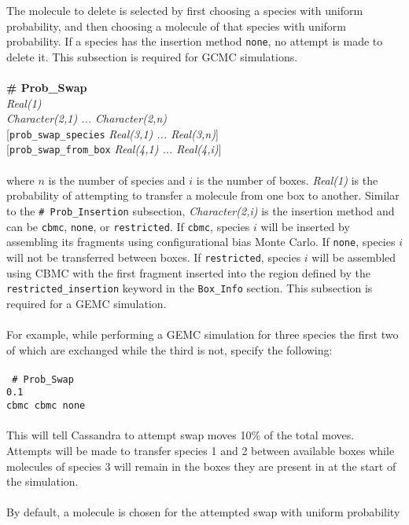 The molecule to delete is selected by first choosing a species with uniform probability, 
and then choosing a molecule of that species with uniform probability.
If a species has the insertion method \texttt{none}, no attempt is made to delete it. 
This subsection is required for GCMC simulations. \\ \\
%
%
%
{\bf \# Prob\_Swap}\\
{\it Real(1)} \\ 
{\it Character(2,1) ... Character(2,n)} \\
{[}{\tt prob\_swap\_species} {\it Real(3,1) ... Real(3,n)}] \\
{[}{\tt prob\_swap\_from\_box} {\it Real(4,1) ... Real(4,i)}] \\ \\
%
where $n$ is the number of species and $i$ is the number of boxes.
{\em Real(1)} is the probability of attempting to transfer a molecule from one box to another. 
Similar to the \texttt{\# Prob\_Insertion} subsection, 
{\em Character(2,i)} is the insertion method and can be 
\texttt{cbmc}, \texttt{none}, or \texttt{restricted}.
If \texttt{cbmc}, species $i$ will be inserted by assembling its 
fragments using configurational bias Monte Carlo.
If \texttt{none}, species $i$ will not be transferred between boxes.
If \texttt{restricted}, species $i$ will be assembled using CBMC
with the first fragment inserted into the region defined by 
the \texttt{restricted\_insertion} keyword in the \texttt{Box\_Info} section.
This subsection is required for a GEMC simulation. \\ \\
%
For example, while performing a GEMC simulation for three species the first two of which are exchanged
while the third is not, specify the following: \\ \\
%
\texttt{ \# Prob\_Swap\\
0.1 \\ 
cbmc cbmc none \\ \\
}
%
This will tell Cassandra to attempt swap moves 10\% of the total moves. 
Attempts will be made to transfer species 1 and 2 between available boxes while molecules 
of species 3 will remain in the boxes they are present in at the start of the simulation. \\ \\
%
By default, a molecule is chosen for the attempted swap with uniform probability 
